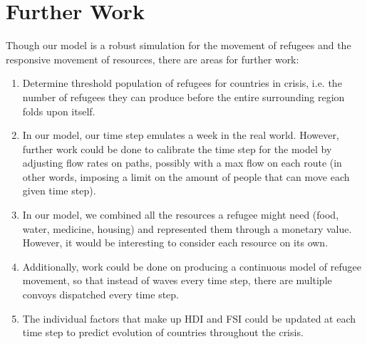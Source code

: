 \documentclass{article}
\begin{document}
\section{Further Work}
Though our model is a robust simulation for the movement of refugees and the responsive movement of resources, there are areas for further work:
\begin{enumerate}
    \item Determine threshold population of refugees for countries in crisis, i.e. the number of refugees they can produce before the entire surrounding region folds upon itself.
    \item In our model, our time step emulates a week in the real world. However, further work could be done to calibrate the time step for the model by adjusting flow rates on paths, possibly with a max flow on each route (in other words, imposing a  limit on the amount of people that can move each given time step).
    \item In our model, we combined all the resources a refugee might need (food, water, medicine, housing) and represented them through a monetary value. However, it would be interesting to consider each resource on its own.
    \item Additionally, work could be done on producing a continuous model of refugee movement, so that instead of waves every time step, there are multiple convoys dispatched every time step.
    \item The individual factors that make up HDI and FSI could be updated at each time step to predict evolution of countries throughout the crisis.
\end{enumerate}


\pagebreak

\newpage


\pagebreak

\newpage
\nocite{*}


\end{document}
